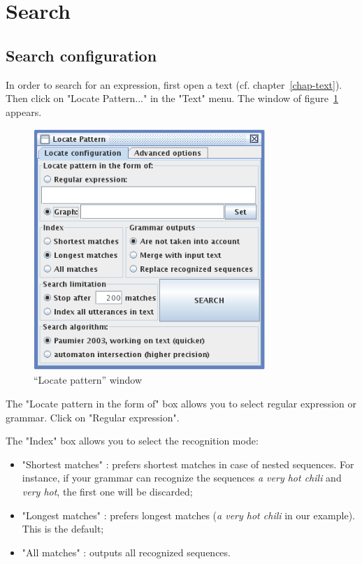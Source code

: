 \section{Search}
\subsection{Search configuration}
\label{section-search-configuration}
In order to search for an expression, first open a text (cf.
chapter~\ref{chap-text}). Then click on "Locate Pattern..." in the "Text" menu.
The window of
figure~\ref{fig-regexp-search-configuration}
appears.

\bigskip
\begin{figure}[!ht]
\begin{center}
\includegraphics[width=8.8cm]{resources/img/fig4-4.png}
\caption{``Locate pattern'' window\label{fig-regexp-search-configuration}}
\end{center}
\end{figure}

\noindent The "Locate pattern in the form of" box allows you to select regular
expression or grammar. Click on "Regular expression".

\bigskip
\noindent The "Index" box allows you to select the recognition mode:

\bigskip
{}
\begin{itemize}
  \item "Shortest matches" : prefers shortest matches in case of nested
  sequences. For instance, if your grammar can recognize the sequences \textit{a very hot chili} and 
  \textit{very hot}, the first one will be discarded;
  \item "Longest matches" : prefers longest matches (\textit{a very hot chili}
  in our example). This is the default;
  \item "All matches" : outputs all recognized sequences.
\end{itemize}

